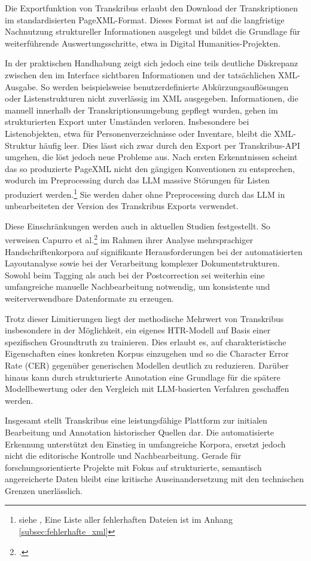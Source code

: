 \documentclass[12pt, a4paper, ngerman, bidi=default]{article}
\let\cite\footcite
\begin{document}
Die Exportfunktion von Transkribus erlaubt den Download der Transkriptionen im standardisierten PageXML-Format. Dieses Format ist auf die langfristige Nachnutzung 
struktureller Informationen ausgelegt und bildet die Grundlage für weiterführende Auswertungsschritte, etwa in Digital Humanities-Projekten.

In der praktischen Handhabung zeigt sich jedoch eine teils deutliche Diskrepanz zwischen den im Interface sichtbaren Informationen und der tatsächlichen XML-Ausgabe. 
So werden beispielsweise benutzerdefinierte Abkürzungsauflösungen oder Listenstrukturen nicht zuverlässig im XML ausgegeben. 
Informationen, die manuell innerhalb der Transkriptionsumgebung gepflegt wurden, gehen im strukturierten Export unter Umständen verloren. 
Insbesondere bei Listenobjekten, etwa für Personenverzeichnisse oder Inventare, bleibt die XML-Struktur häufig leer. Dies lässt sich zwar durch den Export per Transkribus-API umgehen, die löst jedoch neue Probleme aus. Nach ersten Erkenntnissen scheint das so produzierte PageXML nicht den gängigen Konventionen zu entsprechen, wodurch im Preprocessing durch das LLM massive Störungen für Listen produziert werden.\footnote{siehe , Eine Liste aller fehlerhaften Dateien ist im Anhang \ref{subsec:fehlerhafte_xml}} Sie werden daher ohne Preprocessing durch das LLM in unbearbeiteten der Version des Transkribus Exports verwendet.

Diese Einschränkungen werden auch in aktuellen Studien festgestellt. So verweisen Capurro et al.\cite[][]{capurro_experimenting_2023} im Rahmen ihrer Analyse mehrsprachiger Handschriftenkorpora 
auf signifikante Herausforderungen bei der automatisierten Layoutanalyse sowie bei der Verarbeitung komplexer Dokumentstrukturen. 
Sowohl beim Tagging als auch bei der Postcorrection sei weiterhin eine umfangreiche manuelle Nachbearbeitung notwendig, um konsistente und weiterverwendbare Datenformate zu erzeugen.

Trotz dieser Limitierungen liegt der methodische Mehrwert von Transkribus insbesondere in der Möglichkeit, ein eigenes HTR-Modell auf Basis einer spezifischen Groundtruth zu trainieren. 
Dies erlaubt es, auf charakteristische Eigenschaften eines konkreten Korpus einzugehen und so die Character Error Rate (CER) gegenüber generischen Modellen deutlich zu reduzieren. 
Darüber hinaus kann durch strukturierte Annotation eine Grundlage für die spätere Modellbewertung oder den Vergleich mit LLM-basierten Verfahren geschaffen werden.

Insgesamt stellt Transkribus eine leistungsfähige Plattform zur initialen Bearbeitung und Annotation historischer Quellen dar. 
Die automatisierte Erkennung unterstützt den Einstieg in umfangreiche Korpora, ersetzt jedoch nicht die editorische Kontrolle und Nachbearbeitung. 
Gerade für forschungsorientierte Projekte mit Fokus auf strukturierte, semantisch angereicherte Daten bleibt eine kritische Auseinandersetzung mit den technischen Grenzen unerlässlich.
\end{document}
